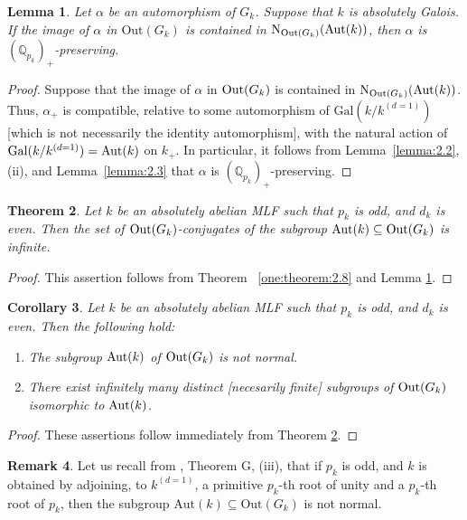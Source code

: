 \documentclass[12pt,showkeys]{amsart}
\theoremstyle{theorem}
\newtheorem{theorem}{Theorem}[section]
\newtheorem{corollary}[theorem]{Corollary}
\newtheorem{lem}[theorem]{Lemma}
\theoremstyle{definition}
\newtheorem{remark}[theorem]{Remark}
\def\bQ{{\mathbb Q}}
\def\Aut{{\mbox{Aut}}}
\begin{document}
\begin{lem}\label{new:lemma:2.7}
Let $\alpha$ be an automorphism of $G_k$. Suppose that $k$ is absolutely Galois. 
If the image of $\alpha$ in $\mathrm{Out}(G_k)$ is contained in ${\rm N}_{{\rm Out}(G_k)}({\rm Aut}(k))$, then $\alpha$ is $(\bQ_{p_k})_+$-preserving. 
\end{lem}
\begin{proof}
Suppose that the image of $\alpha$ in ${\rm Out}(G_k)$ is contained in ${\rm N}_{{\rm Out}(G_k)}({\rm Aut}(k))$. 
Thus, $\alpha_+$ is compatible, relative to some automorphism of $\mathrm{Gal}(k/k^{(d=1)})$ [which is not necessarily the identity automorphism], with the natural action of ${\rm Gal}(k/k^{(d=1)}) = \Aut(k)$ on $k_+$. 
In particular, it follows from Lemma~\ref{lemma:2.2}, (ii), and Lemma~\ref{lemma:2.3} that $\alpha$ is $(\bQ_{p_k})_+$-preserving.  
\end{proof}

\begin{theorem}\label{two:theorem:2.8}
Let $k$ be an absolutely abelian MLF such that $p_k$ is odd, and $d_k$ is even. Then the set of ${\rm Out}(G_k)$-conjugates of the subgroup ${\rm Aut}(k) \subseteq {\rm Out}(G_k)$ is infinite. 
\end{theorem}

\begin{proof}
This assertion follows from Theorem ~\ref{one:theorem:2.8} and Lemma \ref{new:lemma:2.7}. 
\end{proof}

\begin{corollary}\label{corollary:2.9}
Let $k$ be an absolutely abelian MLF such that $p_k$ is odd, and $d_k$ is even. Then the following hold: 
   \begin{enumerate}[label=(\arabic*),ref=(\arabic*)]
   	\item[\rm (i)] The subgroup ${\rm Aut}(k)$ of ${\rm Out}(G_k)$ is not normal. \label{colloraly:2.9:statement:1}
   	\item[\rm (ii)] There exist infinitely many distinct [necesarily finite] subgroups of ${\rm Out}(G_k)$ isomorphic to ${\rm Aut}(k)$.  \label{corollary:2.9:statement:2}   
   \end{enumerate}
\end{corollary}
\begin{proof}
These assertions follow immediately from Theorem \ref{two:theorem:2.8}. 
\end{proof}

\begin{remark}\label{remark:2.10}
Let us recall from \cite{Hoshi2}, Theorem G, (iii), that 
if $p_k$ is odd, and $k$  is obtained by adjoining, to $k^{(d=1)}$, a 
primitive $p_k$-th root of unity and a $p_k$-th root of 
$p_k$, then the subgroup $\mathrm{Aut}(k) \subseteq 
\mathrm{Out}(G_k)$ is not normal. 
\end{remark}
\end{document}
